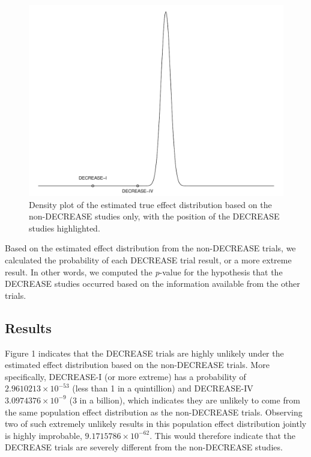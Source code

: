 \documentclass[]{article}
\begin{document}
\begin{figure}

{\centering \includegraphics[width=0.8\linewidth]{../figures/fig1} 

}

\caption{Density plot of the estimated true effect distribution based on the non-DECREASE studies only, with the position of the DECREASE studies highlighted.}\label{fig:figure 1}
\end{figure}

Based on the estimated effect distribution from the non-DECREASE trials,
we calculated the probability of each DECREASE trial result, or a more
extreme result. In other words, we computed the \emph{p}-value for the
hypothesis that the DECREASE studies occurred based on the information
available from the other trials.

\subsection{Results}\label{results-1}

Figure 1 indicates that the DECREASE trials are highly unlikely under
the estimated effect distribution based on the non-DECREASE trials. More
specifically, DECREASE-I (or more extreme) has a probability of
\(2.9610213\times 10^{-53}\) (less than 1 in a quintillion) and
DECREASE-IV \(3.0974376\times 10^{-9}\) (3 in a billion), which
indicates they are unlikely to come from the same population effect
distribution as the non-DECREASE trials. Observing two of such extremely
unlikely results in this population effect distribution jointly is
highly improbable, \(9.1715786\times 10^{-62}\). This would therefore
indicate that the DECREASE trials are severely different from the
non-DECREASE studies.
\end{document}
